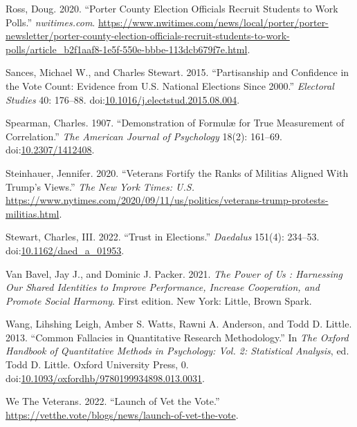 \documentclass[
  12pt,
  letterpaper,
]{article}
\newlength{\cslhangindent}
\newenvironment{CSLReferences}[2] %
 {\begin{list}{}{%
  \setlength{\itemindent}{0pt}
  \setlength{\leftmargin}{0pt}
  \setlength{\parsep}{0pt}
  \ifodd #1
   \setlength{\leftmargin}{\cslhangindent}
   \setlength{\itemindent}{-1\cslhangindent}
  \fi
  \setlength{\itemsep}{#2\baselineskip}}}
 {\end{list}}
\begin{document}
\begin{CSLReferences}{1}{1}
Ross, Doug. 2020. {``Porter {County} Election Officials Recruit Students
to Work Polls.''} \emph{nwitimes.com}.
\url{https://www.nwitimes.com/news/local/porter/porter-newsletter/porter-county-election-officials-recruit-students-to-work-polls/article_b2f1aaf8-1e5f-550e-bbbe-113dcb679f7e.html}.

Sances, Michael W., and Charles Stewart. 2015. {``Partisanship and
Confidence in the Vote Count: {Evidence} from {U}.{S}. National
Elections Since 2000.''} \emph{Electoral Studies} 40: 176--88.
doi:\href{https://doi.org/10.1016/j.electstud.2015.08.004}{10.1016/j.electstud.2015.08.004}.

Spearman, Charles. 1907. {``Demonstration of {Formulæ} for {True
Measurement} of {Correlation}.''} \emph{The American Journal of
Psychology} 18(2): 161--69.
doi:\href{https://doi.org/10.2307/1412408}{10.2307/1412408}.

Steinhauer, Jennifer. 2020. {``Veterans {Fortify} the {Ranks} of
{Militias Aligned With Trump}'s {Views}.''} \emph{The New York Times:
U.S.}
\url{https://www.nytimes.com/2020/09/11/us/politics/veterans-trump-protests-militias.html}.

Stewart, Charles, III. 2022. {``Trust in {Elections}.''} \emph{Daedalus}
151(4): 234--53.
doi:\href{https://doi.org/10.1162/daed_a_01953}{10.1162/daed\_a\_01953}.

Van Bavel, Jay J., and Dominic J. Packer. 2021. \emph{The Power of Us :
Harnessing Our Shared Identities to Improve Performance, Increase
Cooperation, and Promote Social Harmony}. First edition. New York:
Little, Brown Spark.

Wang, Lihshing Leigh, Amber S. Watts, Rawni A. Anderson, and Todd D.
Little. 2013. {``Common {Fallacies} in {Quantitative Research
Methodology}.''} In \emph{The {Oxford Handbook} of {Quantitative
Methods} in {Psychology}: {Vol}. 2: {Statistical Analysis}}, ed. Todd D.
Little. Oxford University Press, 0.
doi:\href{https://doi.org/10.1093/oxfordhb/9780199934898.013.0031}{10.1093/oxfordhb/9780199934898.013.0031}.

We The Veterans. 2022. {``Launch of {Vet} the {Vote}.''}
\url{https://vetthe.vote/blogs/news/launch-of-vet-the-vote}.


\end{CSLReferences}
\end{document}

